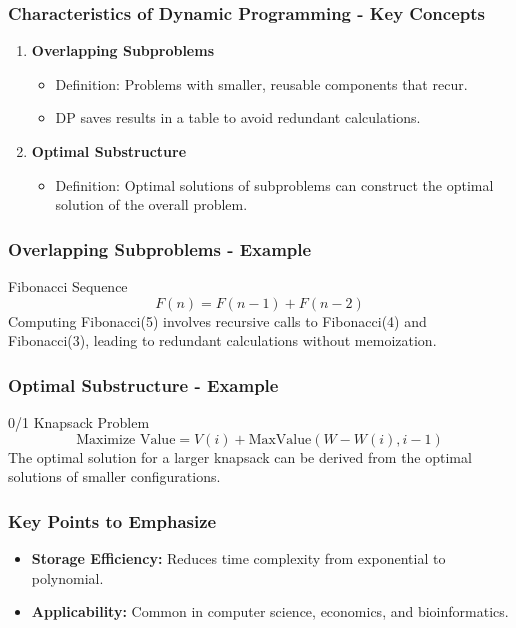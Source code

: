 \documentclass[aspectratio=169]{beamer}
\begin{document}
\begin{frame}[fragile]
    \frametitle{Characteristics of Dynamic Programming - Key Concepts}
    \begin{enumerate}
        \item \textbf{Overlapping Subproblems}
            \begin{itemize}
                \item Definition: Problems with smaller, reusable components that recur.
                \item DP saves results in a table to avoid redundant calculations.
            \end{itemize}
        \item \textbf{Optimal Substructure}
            \begin{itemize}
                \item Definition: Optimal solutions of subproblems can construct the optimal solution of the overall problem.
            \end{itemize}
    \end{enumerate}
\end{frame}

\begin{frame}[fragile]
    \frametitle{Overlapping Subproblems - Example}
    \begin{block}{Fibonacci Sequence}
        \begin{equation}
            F(n) = F(n-1) + F(n-2)
        \end{equation}
        Computing Fibonacci(5) involves recursive calls to Fibonacci(4) and Fibonacci(3), leading to redundant calculations without memoization.
    \end{block}
\end{frame}

\begin{frame}[fragile]
    \frametitle{Optimal Substructure - Example}
    \begin{block}{0/1 Knapsack Problem}
        \begin{equation}
            \text{Maximize Value} = V(i) + \text{MaxValue}(W - W(i), i-1)
        \end{equation}
        The optimal solution for a larger knapsack can be derived from the optimal solutions of smaller configurations.
    \end{block}
\end{frame}

\begin{frame}[fragile]
    \frametitle{Key Points to Emphasize}
    \begin{itemize}
        \item \textbf{Storage Efficiency:} Reduces time complexity from exponential to polynomial.
        \item \textbf{Applicability:} Common in computer science, economics, and bioinformatics.
    \end{itemize}
\end{frame}
\end{document}
